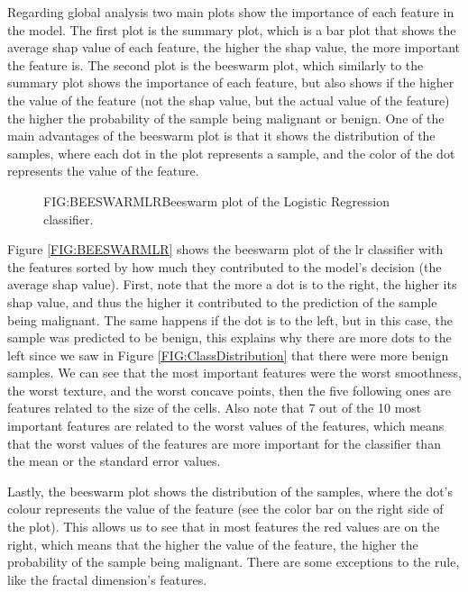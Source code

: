 Regarding global analysis two main plots show the importance of each feature in the model. The first plot is the summary plot, which is a bar plot that shows the average \ac{shap} value of each feature, the higher the \ac{shap} value, the more important the feature is. The second plot is the beeswarm plot, which similarly to the summary plot shows the importance of each feature, but also shows if the higher the value of the feature (not the \ac{shap} value, but the actual value of the feature) the higher the probability of the sample being malignant or benign. One of the main advantages of the beeswarm plot is that it shows the distribution of the samples, where each dot in the plot represents a sample, and the color of the dot represents the value of the feature.

\begin{figure}[Beeswarm Plot of Logistic Regression]{FIG:BEESWARMLR}{Beeswarm plot of the Logistic Regression classifier.}
\end{figure}

Figure \ref{FIG:BEESWARMLR} shows the beeswarm plot of the \ac{lr} classifier with the features sorted by how much they contributed to the model's decision (the average \ac{shap} value). First, note that the more a dot is to the right, the higher its \ac{shap} value, and thus the higher it contributed to the prediction of the sample being malignant. The same happens if the dot is to the left, but in this case, the sample was predicted to be benign, this explains why there are more dots to the left since we saw in Figure \ref{FIG:ClassDistribution} that there were more benign samples. We can see that the most important features were the worst smoothness, the worst texture, and the worst concave points, then the five following ones are features related to the size of the cells. Also note that 7 out of the 10 most important features are related to the worst values of the features, which means that the worst values of the features are more important for the classifier than the mean or the standard error values.

Lastly, the beeswarm plot shows the distribution of the samples, where the dot's colour represents the value of the feature (see the color bar on the right side of the plot). This allows us to see that in most features the red values are on the right, which means that the higher the value of the feature, the higher the probability of the sample being malignant. There are some exceptions to the rule, like the fractal dimension's features.


